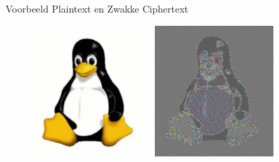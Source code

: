 \documentclass{beamer}
\begin{document}
\begin{frame}{Voorbeeld Plaintext en Zwakke Ciphertext}
\begin{center}
	\begin{figure}
		\includegraphics[width=0.40\textwidth]{img/tux.png}
		\quad
		\includegraphics[width=0.40\textwidth]{img/tux_ecb.png}
	\end{figure}
\end{center}
\end{frame}


\end{document}

